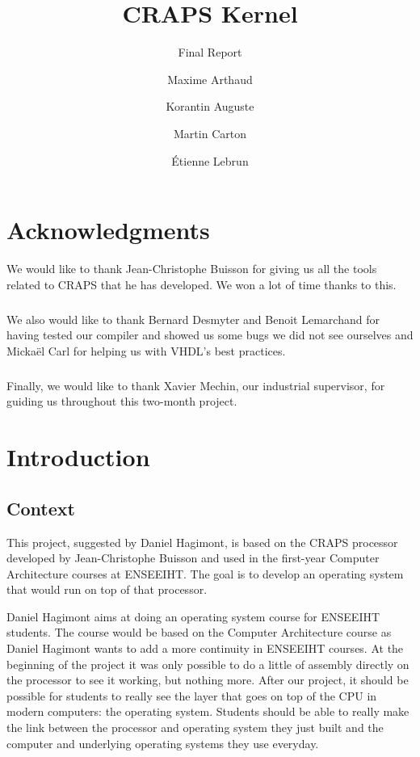 \documentclass[openany, a4paper]{book}
\title{CRAPS Kernel}
\subtitle{Final Report}
\author{
       Maxime Arthaud
  \and Korantin Auguste
  \and Martin Carton
  \and Étienne Lebrun
}
\begin{document}
  

  \chapter*{Acknowledgments}
    We would like to thank Jean-Christophe Buisson for giving us all the tools
    related to CRAPS that he has developed. We won a lot of time thanks to this.

    \paragraph{}
    We also would like to thank Bernard Desmyter and Benoit Lemarchand for
    having tested our compiler and showed us some bugs we did not see ourselves
    and Mickaël Carl for helping us with VHDL's best practices.

    \paragraph{}
    Finally, we would like to thank Xavier Mechin, our industrial supervisor,
    for guiding us throughout this two-month project.

  \tableofcontents

  \chapter{Introduction}
    \section{Context}
      This project, suggested by Daniel Hagimont, is based on the CRAPS
      processor developed by Jean-Christophe Buisson and used in the first-year
      Computer Architecture courses at ENSEEIHT. The goal is to develop an
      operating system that would run on top of that processor.

      Daniel Hagimont aims at doing an operating system course for ENSEEIHT
      students. The course would be based on the Computer Architecture course as
      Daniel Hagimont wants to add a more continuity in ENSEEIHT courses. At the
      beginning of the project it was only possible to do a little of assembly
      directly on the processor to see it working, but nothing more.
      After our project, it should be possible for students to really see
      the layer that goes on top of the CPU in modern computers: the operating
      system. Students should be able to really make the link between the
      processor and operating system they just built and the computer and
      underlying operating systems they use everyday.
\end{document}

